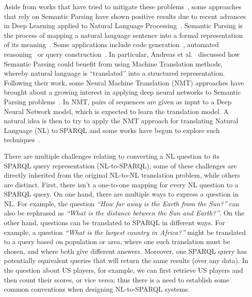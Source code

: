 Aside from works that have tried to mitigate these problems~\cite{semPar:lexical-gap-HakimovUWC15, semPar:complex-queries-GliozzoK12}, some approaches 
that rely on Semantic Parsing have shown positive results due to recent advances in Deep 
Learning applied to Natural Language Processing~\cite{semPar:sempar-as-mt-AndreasVC13}. Semantic Parsing is the process of 
mapping a natural language sentence into a formal representation of its meaning~\cite{semPar:sempar-as-mt-AndreasVC13}. Some 
applications include code generation~\cite{semPar:code-gen-RabinovichSK17, semPar:tranx-code-gen-YinN18}, 
automated reasoning~\cite{semPar:ITPKaliszykUV17} or query construction~\cite{semPar:txt-to-sql-RadevKZZFRS18}. 
In particular, Andreas et al.~\cite{semPar:sempar-as-mt-AndreasVC13} discussed how Semantic Parsing could benefit from using 
Machine Translation methods, whereby natural language is “translated” into a structured 
representation. Following their work, some Neural Machine Translation (NMT) approaches 
have brought about a growing interest in applying deep neural networks to Semantic Parsing 
problems~\cite{nmt:CaiXZYLL18, nmt:DongL16, nmt:ZhongCoRR17}. In NMT, pairs of sequences are given as input to a Deep Neural Network 
model, which is expected to learn the translation model. A natural idea is then to try to apply 
the NMT approach for translating Natural Language (NL) to SPARQL and some works have begun to explore such techniques~\cite{nmt:CoRRLuz18, nmt:nspm-SoruMMPVEN17, nmt:CoRRSoru18}.

There are multiple challenges relating to converting a NL question to its SPARQL query 
representation (NL-to-SPARQL); some of these challenges are directly inherited from the 
original NL-to-NL translation problem, while others are distinct. First, there isn’t a one-to-one 
mapping for every NL question to a SPARQL query. On one hand, there are multiple ways to 
express a question in NL. For example, the question \textit{“How far away is the Earth from the Sun?”} 
can also be rephrased as \textit{“What is the distance between the Sun and Earth?”}. On the other 
hand, questions can be translated to SPARQL in different ways. For example, a question \textit{“What 
is the largest country in Africa?”} might be translated to a query based on population or area, 
where one such translation must be chosen, and where both give different answers. Moreover, 
one SPARQL query has potentially equivalent queries that will return the same results (over any 
data). In the question about US players, for example, we can first retrieve US players and then 
count their scores, or vice versa; thus there is a need to establish some common conventions 
when designing NL-to-SPARQL systems. 

